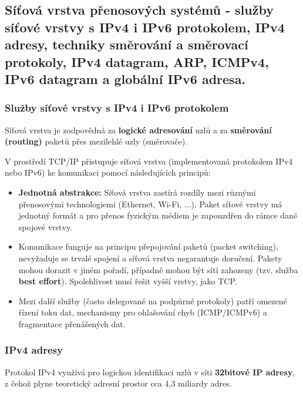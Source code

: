     \newpage
    \subsection{Síťová vrstva přenosových systémů - služby síťové vrstvy s IPv4 i IPv6 protokolem, IPv4 adresy, techniky směrování a směrovací protokoly, IPv4 datagram, ARP, ICMPv4, IPv6 datagram a globální IPv6 adresa. }
        \subsubsection{Služby síťové vrstvy s IPv4 i IPv6 protokolem}

            Síťová vrstva je zodpovědná za \textbf{logické adresování} uzlů a za \textbf{směrování (routing)} paketů přes mezilehlé uzly (směrovače).
            
            V prostředí TCP/IP přistupuje síťová vrstva (implementovaná protokolem IPv4 nebo IPv6) ke komunikaci pomocí následujících principů:
            
            \begin{itemize}
                \item \textbf{Jednotná abstrakce:} Síťová vrstva zastírá rozdíly mezi různými přenosovými technologiemi (Ethernet, Wi-Fi, ...). Paket síťové vrstvy má jednotný formát a pro přenos fyzickým médiem je zapouzdřen do rámce dané spojové vrstvy.
                \item Komunikace funguje na principu přepojování paketů (packet switching), nevyžaduje se trvalé spojení a síťová vrstva negarantuje doručení. Pakety mohou dorazit v jiném pořadí, případně mohou být sítí zahozeny (tzv. služba \textbf{best effort}). Spolehlivost musí řešit vyšší vrstvy, jako TCP.
                \item Mezi další služby (často delegované na podpůrné protokoly) patří omezené řízení toku dat, mechanismy pro ohlašování chyb (ICMP/ICMPv6) a fragmentace přenášených dat.
            \end{itemize}
                
        \subsubsection{IPv4 adresy}

            Protokol IPv4 využívá pro logickou identifikaci uzlů v síti \textbf{32bitové IP adresy}, z čehož plyne teoretický adresní prostor cca 4,3 miliardy adres.
            
